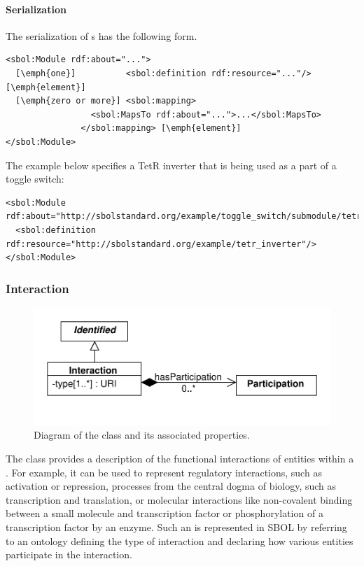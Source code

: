 \paragraph{Serialization}
The serialization of s has the following form.
\begin{lstlisting}
<sbol:Module rdf:about="...">
  [\emph{one}]          <sbol:definition rdf:resource="..."/>[\emph{element}]
  [\emph{zero or more}] <sbol:mapping>
                 <sbol:MapsTo rdf:about="...">...</sbol:MapsTo>
               </sbol:mapping> [\emph{element}]
</sbol:Module>
\end{lstlisting}

The example below specifies a TetR inverter that is being used as
a part of a toggle switch:

\begin{lstlisting}
<sbol:Module rdf:about="http://sbolstandard.org/example/toggle_switch/submodule/tetr_inverter">
  <sbol:definition rdf:resource="http://sbolstandard.org/example/tetr_inverter"/>
</sbol:Module>
\end{lstlisting}


\subsubsection{Interaction}
\label{sec:Interaction}

\begin{figure}[ht]
\begin{center}
\includegraphics[scale=0.6]{uml/interaction}
\caption[]{Diagram of the  class and its associated properties.}
\label{uml:interaction}
\end{center}
\end{figure}

The  class provides a description of the functional interactions of entities within a .
For example, it can be used to represent regulatory interactions, such as activation or repression, processes from the central dogma of biology, such as transcription and translation, or molecular interactions like  non-covalent binding between a small molecule and transcription factor or phosphorylation of a transcription factor by an enzyme.
Such an  is represented in SBOL by referring to an ontology defining the type of interaction and declaring how various entities participate in the interaction.

